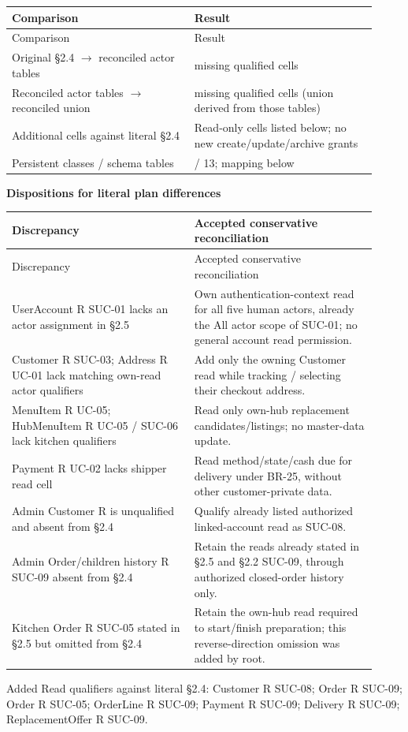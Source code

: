\endgroup
\begin{longtable}{>{\raggedright\arraybackslash}p{0.4600\linewidth}>{\raggedright\arraybackslash}p{0.4600\linewidth}}
Comparison & Result \\
\hline\endfirsthead
Comparison & Result \\
\hline\endhead
Original \S{}2.4 \ensuremath{\rightarrow} reconciled actor tables & 0 missing qualified cells \\
Reconciled actor tables \ensuremath{\rightarrow} reconciled union & 0 missing qualified cells (union derived from those tables) \\
Additional cells against literal \S{}2.4 & Read-only cells listed below; no new create/update/archive grants \\
Persistent classes / schema tables & 13 / 13; mapping below \\
\end{longtable}
\textbf{Dispositions for literal plan differences}

\begin{longtable}{>{\raggedright\arraybackslash}p{0.4600\linewidth}>{\raggedright\arraybackslash}p{0.4600\linewidth}}
Discrepancy & Accepted conservative reconciliation \\
\hline\endfirsthead
Discrepancy & Accepted conservative reconciliation \\
\hline\endhead
UserAccount R SUC-01 lacks an actor assignment in \S{}2.5 & Own authentication-context read for all five human actors, already the All actor scope of SUC-01; no general account read permission. \\
Customer R SUC-03; Address R UC-01 lack matching own-read actor qualifiers & Add only the owning Customer read while tracking / selecting their checkout address. \\
MenuItem R UC-05; HubMenuItem R UC-05 / SUC-06 lack kitchen qualifiers & Read only own-hub replacement candidates/listings; no master-data update. \\
Payment R UC-02 lacks shipper read cell & Read method/state/cash due for delivery under BR-25, without other customer-private data. \\
Admin Customer R is unqualified and absent from \S{}2.4 & Qualify already listed authorized linked-account read as SUC-08. \\
Admin Order/children history R SUC-09 absent from \S{}2.4 & Retain the reads already stated in \S{}2.5 and \S{}2.2 SUC-09, through authorized closed-order history only. \\
Kitchen Order R SUC-05 stated in \S{}2.5 but omitted from \S{}2.4 & Retain the own-hub read required to start/finish preparation; this reverse-direction omission was added by root. \\
\end{longtable}
Added Read qualifiers against literal \S{}2.4: Customer R SUC-08; Order R SUC-09; Order R SUC-05; OrderLine R SUC-09; Payment R SUC-09; Delivery R SUC-09; ReplacementOffer R SUC-09.

